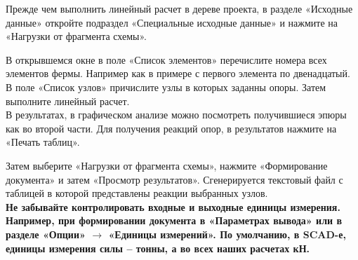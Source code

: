 \documentclass[a4paper,12pt]{article}
\begin{document}
Прежде чем выполнить линейный расчет в дереве проекта, 
в разделе «Исходные данные» откройте подраздел 
«Специальные исходные данные» и  нажмите на 
«Нагрузки от фрагмента схемы».
\begin{figure}[h]
 \center{\texttt{[image: a2]}}
\end{figure}
В открывшемся 
окне в поле «Список элементов» перечислите номера 
всех элементов фермы. Например как в примере с первого 
элемента по двенадцатый. В поле «Список узлов» причислите 
узлы в которых заданны опоры. Затем выполните линейный расчет. \\

В результатах, в графическом анализе можно посмотреть получившиеся 
эпюры как во второй части.  Для получения реакций опор, в результатов 
нажмите на «Печать таблиц».
\begin{figure}[h]
 \center{\texttt{[image: a3]}}
\end{figure}
Затем выберите «Нагрузки от фрагмента схемы», 
нажмите «Формирование документа» и затем «Просмотр результатов». Сгенерируется 
текстовый файл с таблицей в которой представлены реакции выбранных узлов. \\

\bf
Не забывайте контролировать входные и выходные единицы измерения. Например, 
при формировании документа в «Параметрах вывода» или в разделе «Опции» $\to$ «Единицы измерений».
По умолчанию, в SCAD-е, единицы измерения силы – тонны, а во всех наших расчетах кН. 
\end{document}

